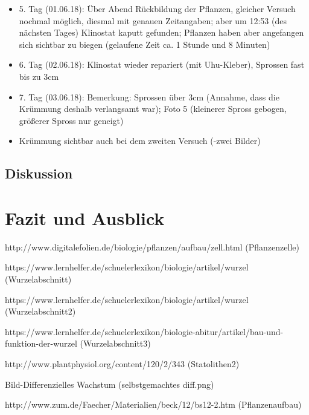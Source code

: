 \documentclass[
a4paper, 
11pt, 
ngerman,
listof=totoc,
bibliography=totocnumbered,
abstracton
]{scrreprt}
\begin{document}
\begin{itemize}
\item 5. Tag (01.06.18): Über Abend Rückbildung der Pflanzen, gleicher Versuch nochmal möglich, diesmal mit genauen Zeitangaben; aber um 12:53 (des nächsten Tages) Klinostat kaputt gefunden; Pflanzen haben aber angefangen sich sichtbar zu biegen (gelaufene Zeit ca. 1 Stunde und 8 Minuten)

\item 6. Tag (02.06.18): Klinostat wieder repariert (mit Uhu-Kleber), Sprossen fast bis zu 3cm

\item 7. Tag (03.06.18): Bemerkung: Sprossen über 3cm (Annahme, dass die Krümmung deshalb verlangsamt war); Foto 5 (kleinerer Spross gebogen, größerer Spross nur geneigt)

\item Krümmung sichtbar auch bei dem zweiten Versuch (-zwei Bilder)

\end{itemize}

\section{Diskussion}

\chapter{Fazit und Ausblick}


\printbibliography

% 
% 
%


http://www.digitalefolien.de/biologie/pflanzen/aufbau/zell.html (Pflanzenzelle)

https://www.lernhelfer.de/schuelerlexikon/biologie/artikel/wurzel (Wurzelabschnitt)

https://www.lernhelfer.de/schuelerlexikon/biologie/artikel/wurzel (Wurzelabschnitt2)

https://www.lernhelfer.de/schuelerlexikon/biologie-abitur/artikel/bau-und-funktion-der-wurzel (Wurzelabschnitt3)

http://www.plantphysiol.org/content/120/2/343 (Statolithen2)

Bild-Differenzielles Wachstum (selbstgemachtes diff.png)

http://www.zum.de/Faecher/Materialien/beck/12/bs12-2.htm (Pflanzenaufbau)
\end{document}
